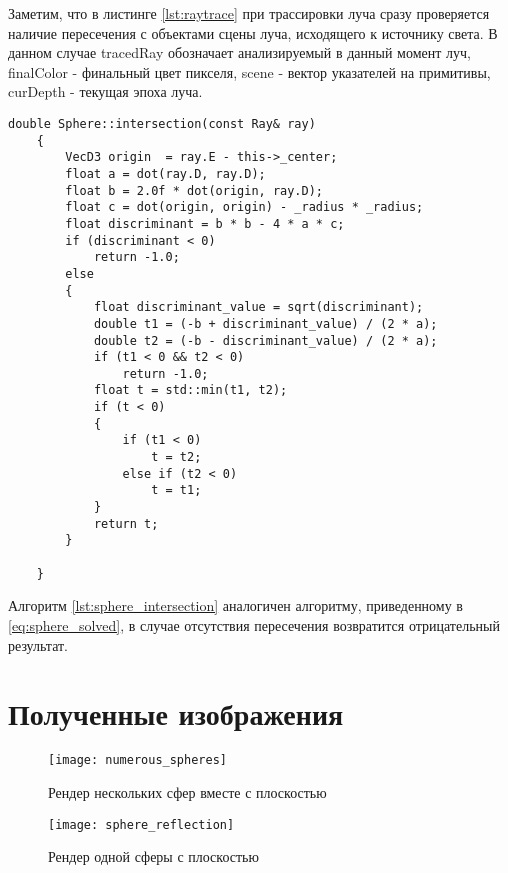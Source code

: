 Заметим, что в листинге \ref{lst:raytrace} при трассировки луча сразу проверяется наличие пересечения с объектами сцены луча, исходящего к источнику света.
В данном случае tracedRay обозначает анализируемый в данный момент луч, finalColor - финальный цвет пикселя, scene - вектор указателей на примитивы, curDepth - текущая эпоха луча.


\begin{lstlisting}[label = lst:sphere_intersection,caption= {Алгоритм поиска пересечения со сферой}]
    double Sphere::intersection(const Ray& ray)
    {
        VecD3 origin  = ray.E - this->_center;
        float a = dot(ray.D, ray.D);
        float b = 2.0f * dot(origin, ray.D);
        float c = dot(origin, origin) - _radius * _radius;
        float discriminant = b * b - 4 * a * c;
        if (discriminant < 0)
            return -1.0; 
        else
        {
            float discriminant_value = sqrt(discriminant);
            double t1 = (-b + discriminant_value) / (2 * a);
            double t2 = (-b - discriminant_value) / (2 * a);
            if (t1 < 0 && t2 < 0)
                return -1.0;
            float t = std::min(t1, t2);
            if (t < 0)
            {
                if (t1 < 0)
                    t = t2;
                else if (t2 < 0)
                    t = t1;
            }
            return t;
        }
    
    }
\end{lstlisting}

Алгоритм \ref{lst:sphere_intersection} аналогичен алгоритму, приведенному в \ref{eq:sphere_solved}, в случае отсутствия пересечения возвратится отрицательный
результат.

\newpage
\section{Полученные изображения}
\begin{figure}[h]
	\centering
	\texttt{[image: numerous\_spheres]}
	\caption{Рендер нескольких сфер вместе с плоскостью}
	\label{fig:numerous_spheres}
\end{figure}

\begin{figure}[h]
	\centering
	\texttt{[image: sphere\_reflection]}
	\caption{Рендер одной сферы с плоскостью}
	\label{fig:numerous_spheres}
\end{figure}